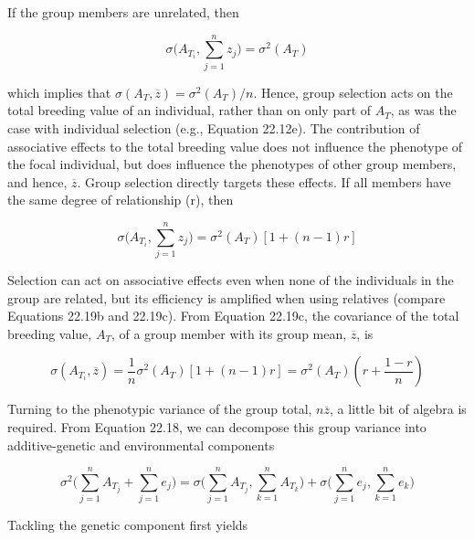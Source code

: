 \documentclass{article}
\begin{document}
If the group members are unrelated, then

\begin{equation}
\sigma\Bigg(A_{T_{i}},\sum_{j=1}^{n}z_{j}\Bigg)=\sigma^{2}(A_{T})
\tag{22.19b}
\label{eq:22_19b}
\end{equation}

which implies that  $ \sigma(A_{T}, \overline{z}) = \sigma^{2}(A_{T})/n $. Hence, group selection acts on the total breeding value of an individual, rather than on only part of  $ A_{T} $, as was the case with individual selection (e.g., Equation 22.12e). The contribution of associative effects to the total breeding value does not influence the phenotype of the focal individual, but does influence the phenotypes of other group members, and hence,  $ \overline{z} $. Group selection directly targets these effects. If all members have the same degree of relationship (r), then

\begin{equation}
\sigma\Bigg(A_{T_{i}},\sum_{j=1}^{n}z_{j}\Bigg)=\sigma^{2}(A_{T})\left[1+(n-1)r\right]
\tag{22.19c}
\label{eq:22_19c}
\end{equation}

Selection can act on associative effects even when none of the individuals in the group are related, but its efficiency is amplified when using relatives (compare Equations 22.19b and 22.19c). From Equation 22.19c, the covariance of the total breeding value,  $ A_T $, of a group member with its group mean,  $ \overline{z} $, is

\begin{equation}
\sigma\left(A_{T_{i}},\overline{z}\right)=\frac{1}{n}\sigma^{2}(A_{T})\left[1+(n-1)r\right]=\sigma^{2}(A_{T})\left(r+\frac{1-r}{n}\right)
\tag{22.19d}
\label{eq:22_19d}
\end{equation}

Turning to the phenotypic variance of the group total,  $ n\overline{z} $, a little bit of algebra is required. From Equation 22.18, we can decompose this group variance into additive-genetic and environmental components

\begin{equation}
\sigma^{2}\Big(\sum_{j=1}^{n}A_{T_{j}}+\sum_{j=1}^{n}e_{j}\Big)=\sigma\Big(\sum_{j=1}^{n}A_{T_{j}},\sum_{k=1}^{n}A_{T_{k}}\Big)+\sigma\Big(\sum_{j=1}^{n}e_{j},\sum_{k=1}^{n}e_{k}\Big)
\tag{22.20}
\label{eq:22_20}
\end{equation}

Tackling the genetic component first yields
\end{document}
